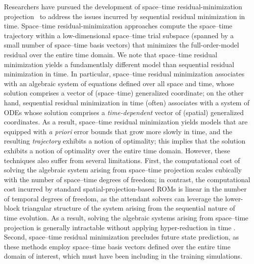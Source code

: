 \documentclass[3p,computermodern,10pt]{elsarticle}
\begin{document}
Researchers have pursued the development of space--time
residual-minimization
projection~\cite{choi_stlspg,constantine_strom,URBAN2012203,Yano2014ASC} to
address the issues incurred by sequential residual minimization in time.
Space--time residual-minimization approaches compute the space--time
trajectory within a low-dimensional space--time trial subspace (spanned by
a small number of space--time basis vectors) that minimizes the full-order-model
residual over the entire time domain.
We note that space--time residual minimization yields a fundamentlaly
different model than sequential residual minimization in time. In particular, space--time
residual minimization associates with an algebraic system of equations defined
over all space and time, whose solution comprises a  vector of
(space--time) generalized coordinate; on the other hand, sequential residual
minimization in time (often) associates with a system of ODEs whose solution
comprises a \textit{time-dependent} vector of (spatial) generalized
coordinates.
As a result, space--time residual minimization yields models that are equipped with \textit{a priori} error bounds that grow more slowly
in time, and the resulting \textit{trajectory} exhibits a notion of
optimality; this implies that the solution exhibits a notion of optimality
over the entire time domain. However, these techniques also suffer from several
limitations. First, the computational cost of solving the algebraic system arising from space--time
projection scales cubically with the number of space--time degrees of freedom;
in contrast, the computational cost incurred by standard
spatial-projection-based ROMs is linear in the number of temporal degrees of
freedom, as the attendant solvers can leverage the lower-block triangular
structure of the system arising from the sequential nature of time
evolution. As a result, solving the algebraic systems arising from space--time
projection is generally intractable without applying hyper-reduction in time
\cite{choi_stlspg,constantine_strom}. Second, space--time residual
minimization precludes future
state prediction, as these methods employ space--time basis vectors defined over the
entire time domain of interest, which must have been including in the training
simulations.
\end{document}
